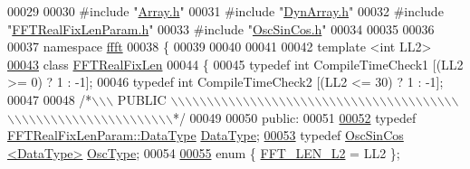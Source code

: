 \begin{DoxyCode}
00029 
00030 \textcolor{preprocessor}{#include    "\hyperlink{a00083}{Array.h}"}
00031 \textcolor{preprocessor}{#include    "\hyperlink{a00091}{DynArray.h}"}
00032 \textcolor{preprocessor}{#include    "\hyperlink{a00099}{FFTRealFixLenParam.h}"}
00033 \textcolor{preprocessor}{#include    "\hyperlink{a00111}{OscSinCos.h}"}
00034 
00035 
00036 
00037 \textcolor{keyword}{namespace }\hyperlink{a00142}{ffft}
00038 \{
00039 
00040 
00041 
00042 \textcolor{keyword}{template} <\textcolor{keywordtype}{int} LL2>
\hypertarget{a00097_source_l00043}{}\hyperlink{a00011}{00043} \textcolor{keyword}{class }\hyperlink{a00011}{FFTRealFixLen}
00044 \{
00045     \textcolor{keyword}{typedef} \textcolor{keywordtype}{int} CompileTimeCheck1 [(LL2 >=  0) ? 1 : -1];
00046     \textcolor{keyword}{typedef} \textcolor{keywordtype}{int} CompileTimeCheck2 [(LL2 <= 30) ? 1 : -1];
00047 
00048 \textcolor{comment}{/*\(\backslash\)\(\backslash\)\(\backslash\) PUBLIC \(\backslash\)\(\backslash\)\(\backslash\)\(\backslash\)\(\backslash\)\(\backslash\)\(\backslash\)\(\backslash\)\(\backslash\)\(\backslash\)\(\backslash\)\(\backslash\)\(\backslash\)\(\backslash\)\(\backslash\)\(\backslash\)\(\backslash\)\(\backslash\)\(\backslash\)\(\backslash\)\(\backslash\)\(\backslash\)\(\backslash\)\(\backslash\)\(\backslash\)\(\backslash\)\(\backslash\)\(\backslash\)\(\backslash\)\(\backslash\)\(\backslash\)\(\backslash\)\(\backslash\)\(\backslash\)\(\backslash\)\(\backslash\)\(\backslash\)\(\backslash\)\(\backslash\)\(\backslash\)\(\backslash\)\(\backslash\)\(\backslash\)\(\backslash\)\(\backslash\)\(\backslash\)\(\backslash\)\(\backslash\)\(\backslash\)\(\backslash\)\(\backslash\)\(\backslash\)\(\backslash\)\(\backslash\)\(\backslash\)\(\backslash\)\(\backslash\)\(\backslash\)\(\backslash\)\(\backslash\)\(\backslash\)\(\backslash\)\(\backslash\)*/}
00049 
00050 \textcolor{keyword}{public}:
00051 
\hypertarget{a00097_source_l00052}{}\hyperlink{a00011_a1aee47aa93a19226faec1c1bf91a6bd4}{00052}    \textcolor{keyword}{typedef}  \hyperlink{a00012_a119afb4512058be9d19dc6069cb3c19b}{FFTRealFixLenParam::DataType}   \hyperlink{a00011_a1aee47aa93a19226faec1c1bf91a6bd4}{DataType};
\hypertarget{a00097_source_l00053}{}\hyperlink{a00011_a0a9743aa5f3a922339e0d29b4e6cd184}{00053}     \textcolor{keyword}{typedef} \hyperlink{a00020}{OscSinCos <DataType>}    \hyperlink{a00011_a0a9743aa5f3a922339e0d29b4e6cd184}{OscType};
00054 
\hypertarget{a00097_source_l00055}{}\hyperlink{a00011_af15d6305b69f1309e44281ede12ea234a309dfdb424deea1d8799f1cda9d678db}{00055}     \textcolor{keyword}{enum} \{          \hyperlink{a00011_af15d6305b69f1309e44281ede12ea234a309dfdb424deea1d8799f1cda9d678db}{FFT\_LEN\_L2}    = LL2   \};

\end{DoxyCode}
